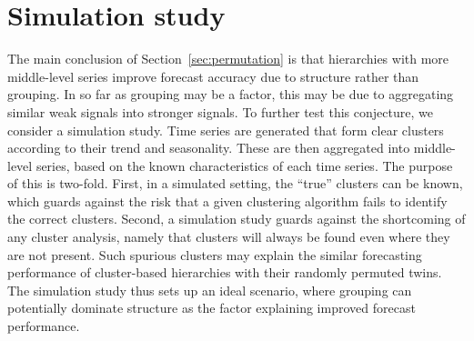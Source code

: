 \documentclass[a4paper,review,12pt,authoryear]{elsarticle}
\begin{document}





\section{Simulation study}
\label{sec:simulation}
The main conclusion of Section~\ref{sec:permutation} is that hierarchies with more middle-level series improve forecast accuracy due to structure rather than grouping. In so far as grouping may be a factor, this may be due to aggregating similar weak signals into stronger signals. To further test this conjecture, we consider a simulation study. Time series are generated that form clear clusters according to their trend and seasonality. These are then aggregated into middle-level series, based on the known characteristics of each time series. The purpose of this is two-fold. First, in a simulated setting, the ``true'' clusters can be known, which guards against the risk that a given clustering algorithm fails to identify the correct clusters. Second, a simulation study guards against the shortcoming of any cluster analysis, namely that clusters will always be found even where they are not present. Such spurious clusters may explain the similar forecasting performance of cluster-based hierarchies with their randomly permuted twins. The simulation study thus sets up an ideal scenario, where grouping can potentially dominate structure as the factor explaining improved forecast performance.


\end{document}
